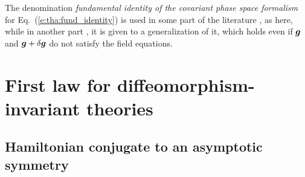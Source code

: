 \begin{remark}
The denomination \emph{fundamental identity of the covariant phase space formalism}
for Eq.~(\ref{e:tha:fund_identity})
is used in some part of the literature \cite{Compe19,GrumiS22,HajiaS16}, as here, while in another part \cite{HollaW13,HollaWZ24},
it is given
to a generalization of it, which holds
even if $\bm{g}$ and $\bm{g}+\delta\bm{g}$ do not satisfy the field equations.
\end{remark}


\section{First law for diffeomorphism-invariant theories} \label{s:tha:first_law}

\subsection{Hamiltonian conjugate to an asymptotic symmetry}

